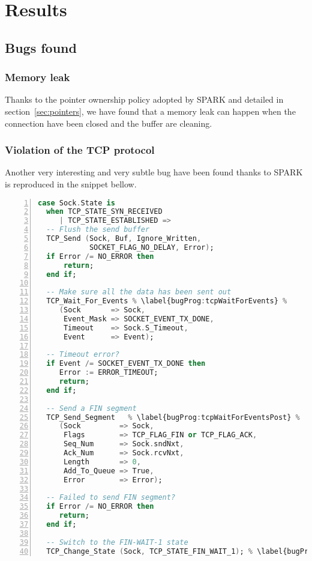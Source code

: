 \documentclass[conference]{IEEEtran}
\begin{document}
\section{Results}
\label{sec:results}

\subsection{Bugs found}

\subsubsection{Memory leak}

Thanks to the pointer ownership policy adopted by SPARK and detailed in
section~\ref{sec:pointers}, we have found that a memory leak can happen when
the connection have been closed and the buffer are cleaning.

\subsubsection{Violation of the TCP protocol}

Another very interesting and very subtle bug have been found thanks to SPARK is
reproduced in the snippet bellow.

\begin{lstlisting}[language=Ada, basicstyle=\footnotesize\ttfamily,
                    numbers=left, numberstyle=\tiny, escapechar=\%]
case Sock.State is
  when TCP_STATE_SYN_RECEIVED
     | TCP_STATE_ESTABLISHED =>
  -- Flush the send buffer
  TCP_Send (Sock, Buf, Ignore_Written,
            SOCKET_FLAG_NO_DELAY, Error);
  if Error /= NO_ERROR then
      return;
  end if;

  -- Make sure all the data has been sent out
  TCP_Wait_For_Events % \label{bugProg:tcpWaitForEvents} %
     (Sock       => Sock,
      Event_Mask => SOCKET_EVENT_TX_DONE,
      Timeout    => Sock.S_Timeout,
      Event      => Event);

  -- Timeout error?
  if Event /= SOCKET_EVENT_TX_DONE then
     Error := ERROR_TIMEOUT;
     return;
  end if;

  -- Send a FIN segment
  TCP_Send_Segment   % \label{bugProg:tcpWaitForEventsPost} %
     (Sock         => Sock,
      Flags        => TCP_FLAG_FIN or TCP_FLAG_ACK,
      Seq_Num      => Sock.sndNxt,
      Ack_Num      => Sock.rcvNxt,
      Length       => 0,
      Add_To_Queue => True,
      Error        => Error);

  -- Failed to send FIN segment?
  if Error /= NO_ERROR then
     return;
  end if;

  -- Switch to the FIN-WAIT-1 state
  TCP_Change_State (Sock, TCP_STATE_FIN_WAIT_1); % \label{bugProg:tcpChangeState} %
\end{lstlisting}
\end{document}
